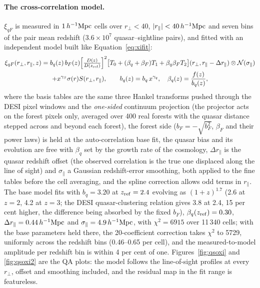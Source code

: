 \documentclass[11pt,a4paper]{article}
\newcommand{\Mpch}{\,h^{-1}{\rm Mpc}}
\begin{document}
\paragraph{The cross-correlation model.} $\xi_{qF}$ is measured in $1\Mpch$ cells over $r_\perp<40$, $|r_\parallel|<40\Mpch$ and seven bins of the pair mean redshift ($3.6\times10^7$ quasar--sightline pairs), and fitted with an independent model built like Equation~\eqref{eq:xifit}:
\begin{multline}
\xi_{qF}(r_\perp,r_\parallel,z)=b_q(z)\,b_F(z)\Big[\tfrac{D(z)}{D(z_{\rm ref})}\Big]^2\big[T_0+(\beta_q+\beta_F)T_1+\beta_q\beta_FT_2\big](r_\perp,r_\parallel-\Delta r_\parallel)\otimes\mathcal N(\sigma_\parallel)\\+x^{\gamma_S}\sigma(r)S(r_\perp,r_\parallel),\qquad b_q(z)=b_q\,x^{\gamma_q},\quad\beta_q(z)=\frac{f(z)}{b_q(z)},
\label{eq:xiqf}
\end{multline}
where the basis tables are the same three Hankel transforms pushed through the DESI pixel windows and the \emph{one-sided} continuum projection (the projector acts on the forest pixels only, averaged over 400 real forests with the quasar distance stepped across and beyond each forest), the forest side ($b_F=-\sqrt{b_F^2}$, $\beta_F$ and their power laws) is held at the auto-correlation base fit, the quasar bias and its evolution are free with $\beta_q$ set by the growth rate of the cosmology, $\Delta r_\parallel$ is the quasar redshift offset (the observed correlation is the true one displaced along the line of sight) and $\sigma_\parallel$ a Gaussian redshift-error smoothing, both applied to the fine tables before the cell averaging, and the spline correction allows odd terms in $r_\parallel$. The base model fits with $b_q=3.20$ at $z_{\rm ref}=2.4$ evolving as $(1+z)^{1.7}$ (2.6 at $z=2$, 4.2 at $z=3$; the DESI quasar-clustering relation gives 3.8 at 2.4, 15 per cent higher, the difference being absorbed by the fixed $b_F$), $\beta_q(z_{\rm ref})=0.30$, $\Delta r_\parallel=0.44\Mpch$ and $\sigma_\parallel=4.9\Mpch$, with $\chi^2=6915$ over 11\,340 cells; with the base parameters held there, the 20-coefficient correction takes $\chi^2$ to 5729, uniformly across the redshift bins (0.46--0.65 per cell), and the measured-to-model amplitude per redshift bin is within 4 per cent of one. Figures~\ref{fig:qsoxi} and \ref{fig:qsoxi2} are the QA plots: the model follows the line-of-sight profiles at every $r_\perp$, offset and smoothing included, and the residual map in the fit range is featureless.
\end{document}
